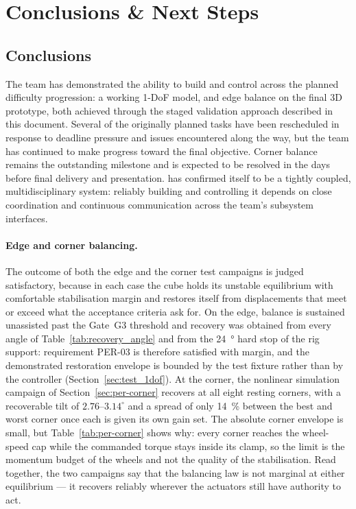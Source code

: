 \section{Conclusions \& Next Steps}
\label{sec:conclusions}

\subsection{Conclusions}
\label{sec:conclusions_summary}



The team has demonstrated the ability to build and control \projectname{} across the planned difficulty progression: a working 1-DoF model, and edge balance on the final 3D prototype, both achieved through the staged validation approach described in this document. Several of the originally planned tasks have been rescheduled in response to deadline pressure and issues encountered along the way, but the team has continued to make progress toward the final objective. Corner balance remains the outstanding milestone and is expected to be resolved in the days before final delivery and presentation.
\projectname{} has confirmed itself to be a tightly coupled, multidisciplinary system: reliably building and controlling it depends on close coordination and continuous communication across the team's subsystem interfaces.

\paragraph{Edge and corner balancing.} The outcome of both the edge and the corner test campaigns is judged satisfactory, because in each case the cube holds its unstable equilibrium with comfortable stabilisation margin and restores itself from displacements that meet or exceed what the acceptance criteria ask for. On the edge, balance is sustained unassisted past the Gate~G3 threshold and recovery was obtained from every angle of Table~\ref{tab:recovery_angle} and from the \qty{24}{\degree} hard stop of the rig support: requirement PER-03 is therefore satisfied with margin, and the demonstrated restoration envelope is bounded by the test fixture rather than by the controller (Section~\ref{sec:test_1dof}). At the corner, the nonlinear simulation campaign of Section~\ref{sec:per-corner} recovers at all eight resting corners, with a recoverable tilt of $2.76$--$3.14^\circ$ and a spread of only \qty{14}{\percent} between the best and worst corner once each is given its own gain set. The absolute corner envelope is small, but Table~\ref{tab:per-corner} shows why: every corner reaches the wheel-speed cap while the commanded torque stays inside its clamp, so the limit is the momentum budget of the wheels and not the quality of the stabilisation. Read together, the two campaigns say that the balancing law is not marginal at either equilibrium --- it recovers reliably wherever the actuators still have authority to act.

